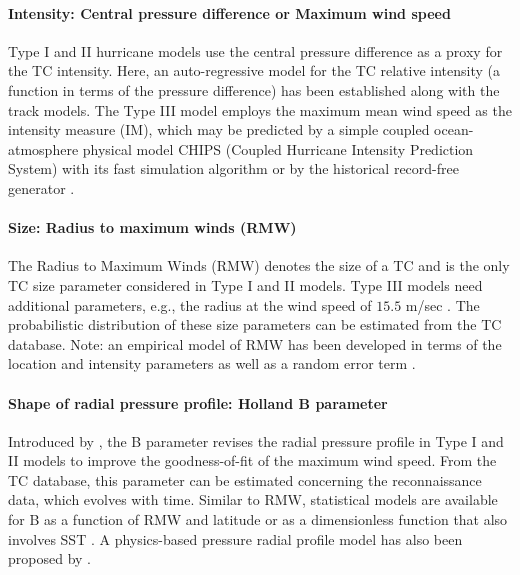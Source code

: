 \paragraph{Intensity: Central pressure difference or Maximum wind speed} Type I and II hurricane models use the central pressure difference as a proxy for the TC intensity. Here, an auto-regressive model for the TC relative intensity (a function in terms of the pressure difference) has been established along with the track models. The Type III model employs the maximum mean wind speed as the intensity measure (IM), which may be predicted by a simple coupled ocean-atmosphere physical model CHIPS (Coupled Hurricane Intensity Prediction System) with its fast simulation algorithm \citep{emanuel2011selfstratification, emanuel2017fast, emanuel2004environmental} or by the historical record-free generator \citep{emanuel2008hurricanes}. 

\paragraph{Size: Radius to maximum winds (RMW)} The Radius to Maximum Winds (RMW) denotes the size of a TC and is the only TC size parameter considered in Type I and II models. Type III models need additional parameters, e.g., the radius at the wind speed of $15.5$ m/sec \citep{chavas2016model}. The probabilistic distribution of these size parameters can be estimated from the TC database. Note: an empirical model of RMW has been developed in terms of the location and intensity parameters as well as a random error term \citep{vickery2008statistical, vickery2009hurricane-b}.

\paragraph{Shape of radial pressure profile: Holland B parameter} Introduced by \citet{holland1980analytic}, the B parameter revises the radial pressure profile in Type I and II models to improve the goodness-of-fit of the maximum wind speed. From the TC database, this parameter can be estimated concerning the reconnaissance data, which evolves with time. Similar to RMW, statistical models are available for B as a function of RMW and latitude \citep{powell2005state} or as a dimensionless function that also involves SST \citep{vickery2008statistical}. A physics-based pressure radial profile model has also been proposed by \citet{holland2008revised, holland2010revised}.

